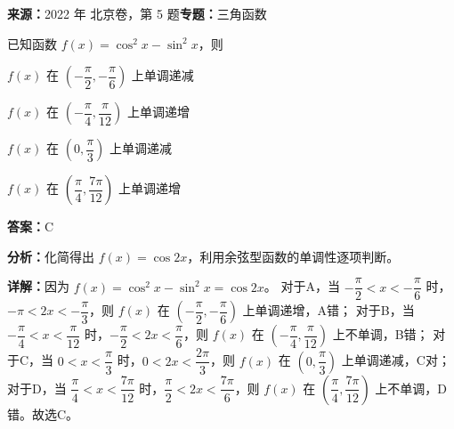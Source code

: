 \begin{question}[points=4]
\textbf{来源：}2022 年 北京卷，第 5 题\quad \textbf{专题：}三角函数\par
已知函数 $f(x) = \cos^2 x - \sin^2 x$，则
\begin{choices}
  \item $f(x)$ 在 $\left(-\dfrac{\pi}{2}, -\dfrac{\pi}{6}\right)$ 上单调递减
  \item $f(x)$ 在 $\left(-\dfrac{\pi}{4}, \dfrac{\pi}{12}\right)$ 上单调递增
  \item $f(x)$ 在 $\left(0, \dfrac{\pi}{3}\right)$ 上单调递减
  \item $f(x)$ 在 $\left(\dfrac{\pi}{4}, \dfrac{7\pi}{12}\right)$ 上单调递增
\end{choices}
\begin{solution}
\textbf{答案：}C

\textbf{分析：}化简得出 $f(x) = \cos 2x$，利用余弦型函数的单调性逐项判断。

\textbf{详解：}因为 $f(x) = \cos^2 x - \sin^2 x = \cos 2x$。
对于A，当 $-\dfrac{\pi}{2} < x < -\dfrac{\pi}{6}$ 时，$-\pi < 2x < -\dfrac{\pi}{3}$，则 $f(x)$ 在 $\left(-\dfrac{\pi}{2}, -\dfrac{\pi}{6}\right)$ 上单调递增，A错；
对于B，当 $-\dfrac{\pi}{4} < x < \dfrac{\pi}{12}$ 时，$-\dfrac{\pi}{2} < 2x < \dfrac{\pi}{6}$，则 $f(x)$ 在 $\left(-\dfrac{\pi}{4}, \dfrac{\pi}{12}\right)$ 上不单调，B错；
对于C，当 $0 < x < \dfrac{\pi}{3}$ 时，$0 < 2x < \dfrac{2\pi}{3}$，则 $f(x)$ 在 $\left(0, \dfrac{\pi}{3}\right)$ 上单调递减，C对；
对于D，当 $\dfrac{\pi}{4} < x < \dfrac{7\pi}{12}$ 时，$\dfrac{\pi}{2} < 2x < \dfrac{7\pi}{6}$，则 $f(x)$ 在 $\left(\dfrac{\pi}{4}, \dfrac{7\pi}{12}\right)$ 上不单调，D错。故选C。
\end{solution}
\end{question}

